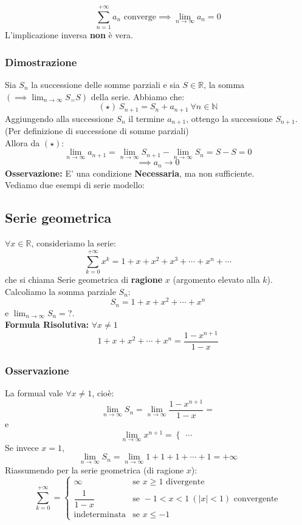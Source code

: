 \documentclass[../main.tex]{subfiles}
\begin{document}
\[
    \sum_{n=1}^{+\infty}a_n \text{ converge} \implies \lim_{n\to\infty}a_n = 0
\]
L'implicazione inversa \textbf{non} è vera.

\subsubsection{Dimostrazione}

Sia $S_n$ la successione delle somme parziali e sia $S\in \mathbb{R}$, la somma
$(\implies \lim_{n\to\infty}S_ = S)$ della serie. Abbiamo che:
\[
    (\star) \ S_{n+1} = S_n + a_{n+1} \ \forall n\in\mathbb{N}
\]
Aggiungendo alla successione $S_n$ il termine $a_{n+1}$, ottengo la successione
$S_{n+1}$. (Per definizione di successione di somme parziali)\\ Allora da
$(\star)$:
\[
    \lim_{n\to\infty}a_{n+1} = \lim_{n\to\infty}S_{n+1} - \lim_{n\to\infty}S_n = S - S = 0
\]
\[
    \implies a_n\to 0
\]
\textbf{Osservazione:}
E' una condizione \textbf{Necessaria}, ma non sufficiente.\\
Vediamo due esempi di serie modello:

\subsection{Serie geometrica}
$\forall x\in \mathbb{R}$, consideriamo la serie:
\[
    \sum_{k=0}^{+\infty} x^k = 1+ x + x^2 + x^3 + \cdots + x^n + \cdots
\]
che si chiama Serie geometrica di \textbf{ragione} $x$ (argomento elevato alla
$k$).\\ Calcoliamo la somma parziale $S_n$:
\[
    S_n = 1 + x + x^2 + \cdots + x^n
\]
e $\lim_{n\to\infty} S_n =$?.\\ \vspace{1pt} \textbf{Formula Risolutiva:}
$\forall x \ne 1$ \[
    1+x+x^2+\cdots+x^n = \dfrac{1-x^{n+1}}{1-x}
\]

\subsubsection{Osservazione}
La formual vale $\forall x \ne 1$, cioè:
\[
    \lim_{n\to\infty}S_n = \lim_{n\to\infty}\dfrac{1-x^{n+1}}{1-x} =
\]
e
\[
    \lim_{n\to\infty}x^{n+1} = \begin{cases}

        \dots
    \end{cases}
\]
Se invece $x = 1$,
\[
    \lim_{n\to\infty}S_n = \lim_{n\to\infty}1+1+1+\cdots+1 = +\infty
\]
Riassumendo per la serie geometrica (di ragione $x$):
\[
    \sum_{k=0}^{+\infty} = \begin{cases}
        \infty               & \text{se } x \geq 1 \text{ divergente}             \\
        \dfrac{1}{1-x}       & \text{se } -1 < x < 1\ (|x|<1) \text{ convergente} \\
        \text{indeterminata} & \text{se } x \leq -1
    \end{cases}
\]
\end{document}
